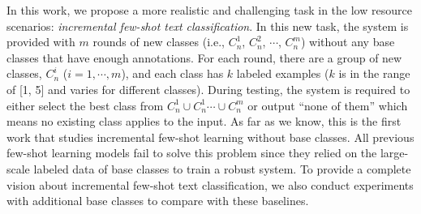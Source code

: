 \documentclass[11pt]{article}
\begin{document}
In this work,
we propose a more realistic and challenging task in the low resource scenarios: \textit{incremental few-shot text classification}. In this new task, the system is provided with $m$ rounds of new classes (i.e., $C^1_n$, $C^2_n$, $\cdots$, $C^m_n$) without any base classes that have enough annotations. For each round, there are a group of new classes, $C^i_n$ ($i=1, \cdots, m$), and each class has $k$ labeled examples ($k$ is in the range of [1, 5] and varies for different classes). During testing, the system is required to either select the best class from $C^1_n \cup C^1_n\cdots \cup C^m_n$ or output ``none of them'' which means no existing class applies to the input. As far as we know, this is the first work that studies incremental few-shot learning without base classes. All previous few-shot learning models \cite{DBLPSnellSZ17, DBLPGidarisK18, yin2020universal, xia2020cg, nguyen2020semantic} fail to solve this problem since they relied on the large-scale labeled data of base classes to train a robust system. To provide a complete vision about incremental few-shot text classification, we also conduct experiments with additional base classes to compare with these baselines.

\end{document}
